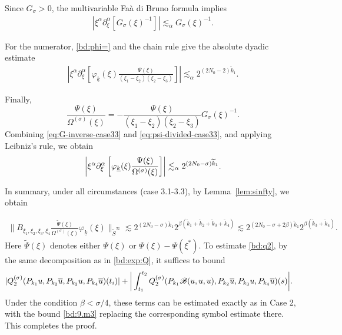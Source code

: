 \documentclass[UTF-8,reqno]{amsart}
\numberwithin{equation}{section}
\theoremstyle{definition}
\begin{document}
Since $G_\sigma>0$, the multivariable Fa\`a di Bruno formula implies
\begin{align}
\left|
\xi^\alpha\partial_\xi^\alpha
\left[
G_\sigma(\xi)^{-1}
\right]
\right|
\lesssim_\alpha
G_\sigma(\xi)^{-1}.
\label{eq:G-inverse-case33}
\end{align} 

For the numerator, \eqref{bd:phi=} and the chain rule give the absolute
dyadic estimate
\begin{align}
\left|
\xi^\alpha\partial_\xi^\alpha
\left[
\varphi_{\underline k}(\xi)
\frac{\Psi(\xi)}
{(\xi_1-\xi_2)(\xi_2-\xi_3)}
\right]
\right|
\lesssim_\alpha
2^{(2N_0-2)\widetilde k_1}.
\label{eq:psi-divided-case33}
\end{align} 

Finally,
\[
\frac{\Psi(\xi)}{\Omega^{(\sigma)}(\xi)}
=
-
\frac{\Psi(\xi)}
     {(\xi_1-\xi_2)(\xi_2-\xi_3)}
G_\sigma(\xi)^{-1}.
\]
Combining \eqref{eq:G-inverse-case33} and
\eqref{eq:psi-divided-case33}, and applying Leibniz's rule, we obtain
\begin{align}
\left|
\xi^\alpha\partial_\xi^\alpha
\left[
\varphi_{\underline{k}}(\xi)
\frac{\Psi(\xi)}{\Omega^{(\sigma)}(\xi)}
\right]
\right|
\lesssim_\alpha
2^{(2N_0-\sigma)\widetilde{k}_1}.\notag
\end{align}
 



In summary, under all circumstances (case 3.1-3.3), by Lemma~\ref{lem:sinfty}, we obtain 

\begin{align}
  \| B_{\xi_1,\xi_2,\xi_3,\xi_4}\frac{\tilde{\Psi}(\xi)}{\Omega^{(\sigma)}(\xi)}\varphi_{\underline k}(\xi)\|_{\tilde{S}^\infty}\lesssim 2^{(2N_0-\sigma)\tilde{k}_1}2^{\beta(\tilde{k}_1+\tilde{k}_2+\tilde{k}_3+\tilde{k}_4)}\lesssim2^{(2N_0-\sigma+2\beta)\tilde{k}_1}2^{\beta(\tilde{k}_3+\tilde{k}_4)}.\label{bd:9.m3}
\end{align} 
Here $\tilde{\Psi}(\xi)$ denotes either $\Psi(\xi)$ or $\Psi(\xi)-\Psi(\xi^*)$.   To estimate \eqref{bd:q2}, by the same decomposition as in \eqref{bd:exp:Q},  it suffices to bound
\begin{align*}
 | Q_2^{(\sigma)}(P_{k_1}u,P_{k_2}\overline u,P_{k_3}u,P_{k_4}\overline u)(t_i)|
 &+  \bigg{|}\int_{t_1}^{t_2}Q_2^{(\sigma)}  (P_{k_1}\mathscr{B}(u,u,u),P_{k_2}\overline u,P_{k_3}u,P_{k_4}\overline u)(s) \bigg{|}.
\end{align*}
Under the condition $\beta<\sigma/4$, 
these terms can be estimated exactly as in Case 2, 
with the bound \eqref{bd:9.m3} replacing the corresponding symbol estimate there. 
This completes the proof.  
 
\end{document}
